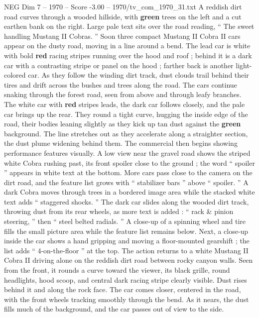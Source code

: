 \begin{textsample}{NEG Dim 7 – 1970 – Score -3.00 – 1970/tv\_com\_1970\_31.txt}  \label{ex:f7_neg_061}
A reddish dirt road curves through a wooded hillside, with \textbf{green} trees on the left and a cut earthen bank on the right.
Large pale text sits over the road reading, “ The sweet handling Mustang II Cobras. ” Soon three compact Mustang II Cobra II cars appear on the dusty road, moving in a line around a bend.
The lead car is white with bold \textbf{red} racing stripes running over the hood and roof ; behind it is a dark car with a contrasting stripe or panel on the hood ; farther back is another light-colored car.
As they follow the winding dirt track, dust clouds trail behind their tires and drift across the bushes and trees along the road.
The cars continue snaking through the forest road, seen from above and through leafy branches.
The white car with \textbf{red} stripes leads, the dark car follows closely, and the pale car brings up the rear.
They round a tight curve, hugging the inside edge of the road, their bodies leaning slightly as they kick up tan dust against the \textbf{green} background.
The line stretches out as they accelerate along a straighter section, the dust plume widening behind them.
The commercial then begins showing performance features visually.
A low view near the gravel road shows the striped white Cobra rushing past, its front spoiler close to the ground ; the word “ spoiler ” appears in white text at the bottom.
More cars pass close to the camera on the dirt road, and the feature list grows with “ stabilizer bars ” above “ spoiler. ” A dark Cobra moves through trees in a bordered image area while the stacked white text adds “ staggered shocks. ” The dark car slides along the wooded dirt track, throwing dust from its rear wheels, as more text is added : “ rack \& pinion steering, ” then “ steel belted radials. ” A close-up of a spinning wheel and tire fills the small picture area while the feature list remains below.
Next, a close-up inside the car shows a hand gripping and moving a floor-mounted gearshift ; the list adds “ 4-on-the-floor ” at the top.
The action returns to a white Mustang II Cobra II driving alone on the reddish dirt road between rocky canyon walls.
Seen from the front, it rounds a curve toward the viewer, its black grille, round headlights, hood scoop, and central dark racing stripe clearly visible.
Dust rises behind it and along the rock face.
The car comes closer, centered in the road, with the front wheels tracking smoothly through the bend.
As it nears, the dust fills much of the background, and the car passes out of view to the side.

\end{textsample}

